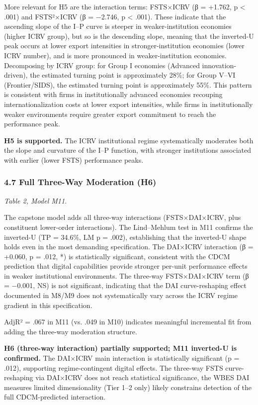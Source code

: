 \documentclass[12pt,a4paper]{article}
\begin{document}
More relevant for H5 are the interaction terms: FSTS×ICRV (β = +1.762, p
\textless{} .001) and FSTS²×ICRV (β = −2.746, p \textless{} .001). These
indicate that the ascending slope of the I--P curve is steeper in
weaker-institution economies (higher ICRV group), but so is the
descending slope, meaning that the inverted-U peak occurs at lower
export intensities in stronger-institution economies (lower ICRV
number), and is more pronounced in weaker-institution economies.
Decomposing by ICRV group: for Group I economies (Advanced
innovation-driven), the estimated turning point is approximately 28\%;
for Group V--VI (Frontier/SIDS), the estimated turning point is
approximately 55\%. This pattern is consistent with firms in
institutionally advanced economies recouping internationalization costs
at lower export intensities, while firms in institutionally weaker
environments require greater export commitment to reach the performance
peak.

\textbf{H5 is supported.} The ICRV institutional regime systematically
moderates both the slope and curvature of the I--P function, with
stronger institutions associated with earlier (lower FSTS) performance
peaks.

\hypertarget{47-full-three-way-moderation-h6}{%
\subsubsection{4.7 Full Three-Way Moderation
(H6)}\label{47-full-three-way-moderation-h6}}

\emph{Table 2, Model M11.}

The capstone model adds all three-way interactions (FSTS×DAI×ICRV, plus
constituent lower-order interactions). The Lind--Mehlum test in M11
confirms the inverted-U (TP = 34.6\%, LM p = .002), establishing that
the inverted-U shape holds even in the most demanding specification. The
DAI×ICRV interaction (β = +0.060, p = .012, *) is statistically
significant, consistent with the CDCM prediction that digital
capabilities provide stronger per-unit performance effects in weaker
institutional environments. The three-way FSTS×DAI×ICRV term (β =
−0.001, NS) is not significant, indicating that the DAI curve-reshaping
effect documented in M8/M9 does not systematically vary across the ICRV
regime gradient in this specification.

AdjR² = .067 in M11 (vs. .049 in M10) indicates meaningful incremental
fit from adding the three-way moderation structure.

\textbf{H6 (three-way interaction) partially supported; M11 inverted-U
is confirmed.} The DAI×ICRV main interaction is statistically
significant (p = .012), supporting regime-contingent digital effects.
The three-way FSTS curve-reshaping via DAI×ICRV does not reach
statistical significance, the WBES DAI measure\textquotesingle s limited
dimensionality (Tier 1--2 only) likely constrains detection of the full
CDCM-predicted interaction.
\end{document}
